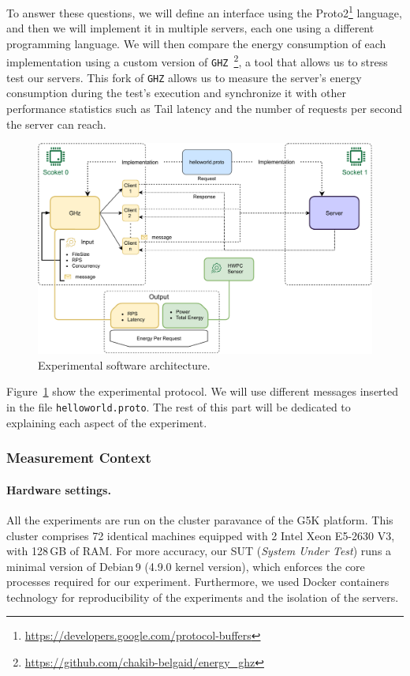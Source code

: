 To answer these questions, we will define an interface using the Proto2\footnote{\url{https://developers.google.com/protocol-buffers}} language, and then we will implement it in multiple servers, each one using a different programming language.
We will then compare the energy consumption of each implementation using a custom version of \texttt{GHZ}~\footnote{\url{https://github.com/chakib-belgaid/energy_ghz}}, a tool that allows us to stress test our servers. This fork of \texttt{GHZ} allows us to measure the server's energy consumption during the test's execution and synchronize it with other performance statistics such as Tail latency and the number of requests per second the server can reach.
\begin{figure}[!hbt]
    \begin{center}
        \includegraphics[width=.8\linewidth]{imgs/rpcprotocol}
    \end{center}
    \caption{Experimental software architecture.}\label{fig:rpcprotocol}
\end{figure}
Figure~\ref{fig:rpcprotocol} show the experimental protocol. We will use different messages inserted in the file \texttt{helloworld.proto}.
The rest of this part will be dedicated to explaining each aspect of the experiment.
\subsubsection{Measurement Context}
\paragraph{Hardware settings.}
All the experiments are run on the cluster \textsf{paravance} of the G5K platform.
This cluster comprises 72 identical machines equipped with 2 Intel Xeon E5-2630 V3, with 128\,GB of RAM.
For more accuracy, our SUT (\emph{System Under Test}) runs a minimal version of Debian\,9 (4.9.0 kernel version), which enforces the core processes required for our experiment.
Furthermore, we used Docker containers technology for reproducibility of the experiments and the isolation of the servers.
